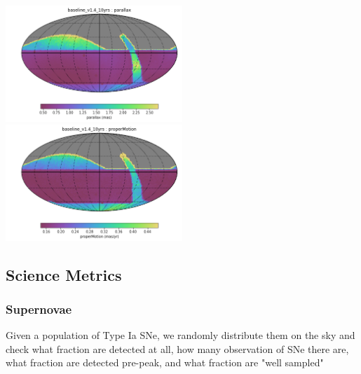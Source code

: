 {\includegraphics[width=0.5\textwidth]{metric_summary/glance/thumb.baseline_v1_4_10yrs_parallax_HEAL_SkyMap.png}
\includegraphics[width=0.5\textwidth]{metric_summary/glance/thumb.baseline_v1_4_10yrs_properMotion_HEAL_SkyMap.png}

\subsection{Science Metrics}

\subsubsection{Supernovae}

Given a population of Type Ia SNe, we randomly distribute them on the sky and check what fraction are detected at all, how many observation of SNe there are, what fraction are detected pre-peak, and what fraction are "well sampled"

}

